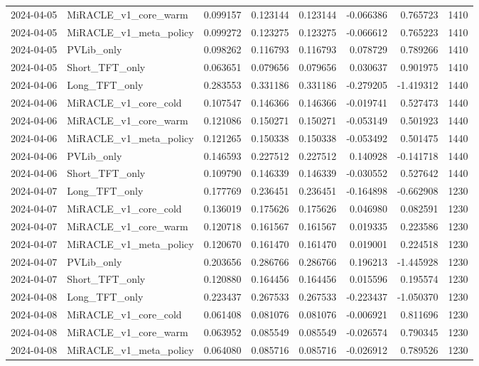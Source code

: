 \begin{tabular}{llrrrrrr}
2024-04-05 & MiRACLE_v1_core_warm & 0.099157 & 0.123144 & 0.123144 & -0.066386 & 0.765723 & 1410 \\
2024-04-05 & MiRACLE_v1_meta_policy & 0.099272 & 0.123275 & 0.123275 & -0.066612 & 0.765223 & 1410 \\
2024-04-05 & PVLib_only & 0.098262 & 0.116793 & 0.116793 & 0.078729 & 0.789266 & 1410 \\
2024-04-05 & Short_TFT_only & 0.063651 & 0.079656 & 0.079656 & 0.030637 & 0.901975 & 1410 \\
2024-04-06 & Long_TFT_only & 0.283553 & 0.331186 & 0.331186 & -0.279205 & -1.419312 & 1440 \\
2024-04-06 & MiRACLE_v1_core_cold & 0.107547 & 0.146366 & 0.146366 & -0.019741 & 0.527473 & 1440 \\
2024-04-06 & MiRACLE_v1_core_warm & 0.121086 & 0.150271 & 0.150271 & -0.053149 & 0.501923 & 1440 \\
2024-04-06 & MiRACLE_v1_meta_policy & 0.121265 & 0.150338 & 0.150338 & -0.053492 & 0.501475 & 1440 \\
2024-04-06 & PVLib_only & 0.146593 & 0.227512 & 0.227512 & 0.140928 & -0.141718 & 1440 \\
2024-04-06 & Short_TFT_only & 0.109790 & 0.146339 & 0.146339 & -0.030552 & 0.527642 & 1440 \\
2024-04-07 & Long_TFT_only & 0.177769 & 0.236451 & 0.236451 & -0.164898 & -0.662908 & 1230 \\
2024-04-07 & MiRACLE_v1_core_cold & 0.136019 & 0.175626 & 0.175626 & 0.046980 & 0.082591 & 1230 \\
2024-04-07 & MiRACLE_v1_core_warm & 0.120718 & 0.161567 & 0.161567 & 0.019335 & 0.223586 & 1230 \\
2024-04-07 & MiRACLE_v1_meta_policy & 0.120670 & 0.161470 & 0.161470 & 0.019001 & 0.224518 & 1230 \\
2024-04-07 & PVLib_only & 0.203656 & 0.286766 & 0.286766 & 0.196213 & -1.445928 & 1230 \\
2024-04-07 & Short_TFT_only & 0.120880 & 0.164456 & 0.164456 & 0.015596 & 0.195574 & 1230 \\
2024-04-08 & Long_TFT_only & 0.223437 & 0.267533 & 0.267533 & -0.223437 & -1.050370 & 1230 \\
2024-04-08 & MiRACLE_v1_core_cold & 0.061408 & 0.081076 & 0.081076 & -0.006921 & 0.811696 & 1230 \\
2024-04-08 & MiRACLE_v1_core_warm & 0.063952 & 0.085549 & 0.085549 & -0.026574 & 0.790345 & 1230 \\
2024-04-08 & MiRACLE_v1_meta_policy & 0.064080 & 0.085716 & 0.085716 & -0.026912 & 0.789526 & 1230 \\

\end{tabular}
